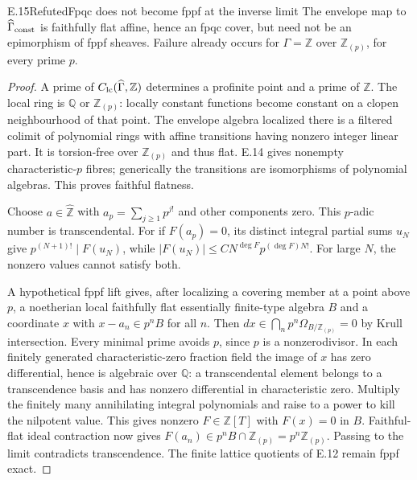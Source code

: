 \begin{statement}{E.15}{Refuted}{Fpqc does not become fppf at the inverse limit}
The envelope map to $\widehat\Gamma_{\rm const}$ is
faithfully flat affine, hence an fpqc cover, but need
not be an epimorphism of fppf sheaves.
Failure already occurs for $\Gamma=\mathbb Z$
over $\mathbb Z_{(p)}$, for every prime $p$.
\end{statement}
\begin{proof}
A prime of $C_{\rm lc}(\widehat\Gamma,\mathbb Z)$ determines
a profinite point and a prime of $\mathbb Z$.
The local ring is $\mathbb Q$ or $\mathbb Z_{(p)}$:
locally constant functions become constant on a clopen
neighbourhood of that point.
The envelope algebra localized there is a filtered
colimit of polynomial rings with affine transitions
having nonzero integer linear part. It is torsion-free
over $\mathbb Z_{(p)}$ and thus flat.
E.14 gives nonempty characteristic-$p$ fibres; generically
the transitions are isomorphisms of polynomial algebras.
This proves faithful flatness.

Choose $a\in\widehat{\mathbb Z}$ with
$a_p=\sum_{j\ge1}p^{j!}$ and other components zero.
This $p$-adic number is transcendental.
For if $F(a_p)=0$, its distinct integral partial sums
$u_N$ give $p^{(N+1)!}\mid F(u_N)$, while
$|F(u_N)|\le C N^{\deg F}p^{(\deg F)N!}$.
For large $N$, the nonzero values cannot satisfy both.

A hypothetical fppf lift gives, after localizing a
covering member at a point above $p$, a noetherian local
faithfully flat essentially finite-type algebra $B$
and a coordinate $x$ with $x-a_n\in p^nB$ for all $n$.
Then $dx\in\bigcap_n p^n\Omega_{B/\mathbb Z_{(p)}}=0$
by Krull intersection.
Every minimal prime avoids $p$, since $p$ is a
nonzerodivisor. In each finitely generated characteristic-zero
fraction field the image of $x$ has zero differential,
hence is algebraic over $\mathbb Q$: a transcendental
element belongs to a transcendence basis and has nonzero
differential in characteristic zero.
Multiply the finitely many annihilating integral polynomials
and raise to a power to kill the nilpotent value.
This gives nonzero $F\in\mathbb Z[T]$ with $F(x)=0$ in $B$.
Faithful-flat ideal contraction now gives
$F(a_n)\in p^nB\cap\mathbb Z_{(p)}=p^n\mathbb Z_{(p)}$.
Passing to the limit contradicts transcendence.
The finite lattice quotients of E.12 remain fppf exact.
\end{proof}

